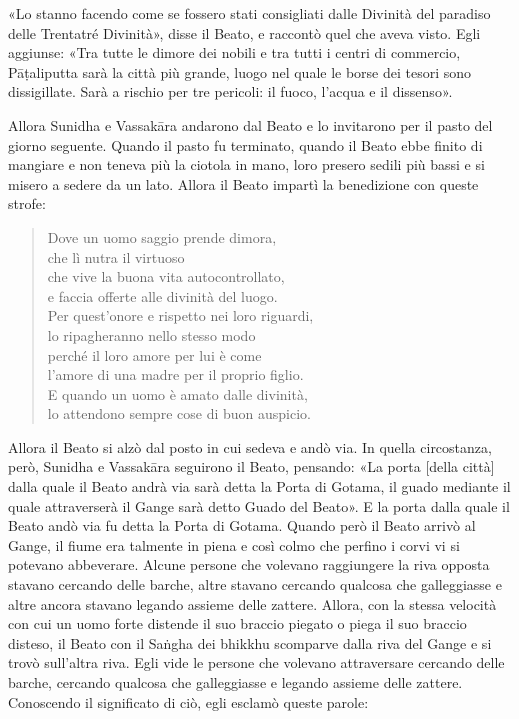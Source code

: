 «Lo stanno facendo come se fossero stati consigliati dalle Divinità del paradiso
delle Trentatré Divinità», disse il Beato, e raccontò quel che aveva visto. Egli
aggiunse: «Tra tutte le dimore dei nobili e tra tutti i centri di commercio,
Pāṭaliputta
sarà la città più grande, luogo nel quale le borse dei tesori sono dissigillate.
Sarà a rischio per tre pericoli: il fuoco, l’acqua e il dissenso».

Allora Sunidha e Vassakāra andarono dal Beato e lo invitarono per il pasto del
giorno seguente. Quando il pasto fu terminato, quando il Beato ebbe finito di
mangiare e non teneva più la ciotola in mano, loro presero sedili più bassi e si
misero a sedere da un lato. Allora il Beato impartì la benedizione con queste
strofe:

\begin{quote}
Dove un uomo saggio prende dimora, \\
che lì nutra il virtuoso \\
che vive la buona vita autocontrollato, \\
e faccia offerte alle divinità del luogo. \\
Per quest’onore e rispetto nei loro riguardi, \\
lo ripagheranno nello stesso modo \\
perché il loro amore per lui è come \\
l’amore di una madre per il proprio figlio. \\
E quando un uomo è amato dalle divinità, \\
lo attendono sempre cose di buon auspicio.
\end{quote}

Allora il Beato si alzò dal posto in cui sedeva e andò via. In quella
circostanza, però, Sunidha e Vassakāra seguirono il Beato, pensando: «La porta
[della città] dalla quale il Beato andrà via sarà detta la Porta di Gotama, il
guado mediante il quale attraverserà il Gange sarà detto Guado del Beato». E la
porta dalla quale il Beato andò via fu detta la Porta di Gotama. Quando però il
Beato arrivò al Gange, il fiume era talmente in piena e così colmo che perfino i
corvi vi si potevano abbeverare. Alcune persone che volevano raggiungere la riva
opposta stavano cercando delle barche, altre stavano cercando qualcosa che
galleggiasse e altre ancora stavano legando assieme delle zattere. Allora, con
la stessa velocità con cui un uomo forte distende il suo braccio piegato o piega
il suo braccio disteso, il Beato con il Saṅgha dei bhikkhu scomparve dalla riva
del Gange e si trovò sull’altra riva. Egli vide le persone che volevano
attraversare cercando delle barche, cercando qualcosa che galleggiasse e legando
assieme delle zattere. Conoscendo il significato di ciò, egli esclamò queste
parole:

